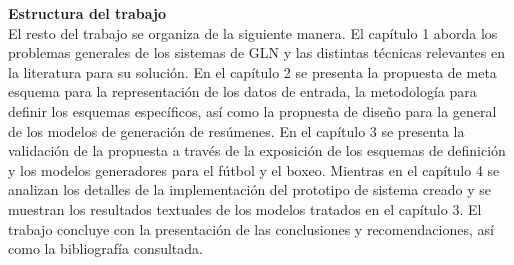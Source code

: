 
    \textbf{Estructura del trabajo}\\

    El resto del trabajo se organiza de la siguiente manera. El capítulo 1 aborda los problemas generales de los sistemas de GLN 
y las distintas técnicas relevantes en la literatura para su solución. En el capítulo 2 se presenta la propuesta de meta esquema para la 
representación de los datos de entrada, la metodología para definir los esquemas específicos, así como la propuesta de diseño para la 
general de los modelos de generación de resúmenes. En el capítulo 3 se presenta la validación
de la propuesta a través de la exposición de los esquemas de definición y los modelos generadores para el fútbol y el boxeo. 
Mientras en el capítulo 4 se analizan los detalles de la implementación del prototipo de sistema creado y se muestran los resultados 
textuales de los modelos tratados en el capítulo 3. El trabajo concluye con la presentación de las 
conclusiones y recomendaciones, así como la bibliografía consultada.